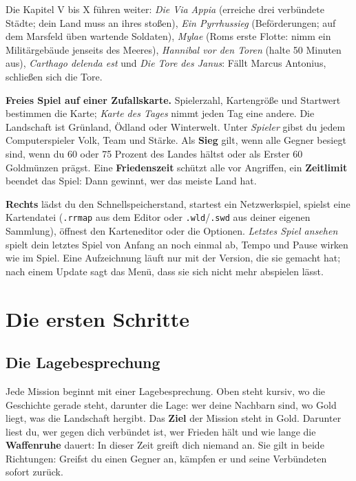 \documentclass[a4paper,11pt,oneside,DIV=12,headings=small,toc=chapterentrydotfill]{scrbook}
\begin{document}
Die Kapitel V bis X führen weiter: \emph{Die Via Appia} (erreiche drei verbündete Städte; dein Land muss an
ihres stoßen), \emph{Ein Pyrrhussieg} (Beförderungen; auf dem Marsfeld üben wartende Soldaten),
\emph{Mylae} (Roms erste Flotte: nimm ein Militärgebäude jenseits des Meeres), \emph{Hannibal vor den Toren}
(halte 50 Minuten aus), \emph{Carthago delenda est} und \emph{Die Tore des Janus}: Fällt Marcus Antonius,
schließen sich die Tore.

\textbf{Freies Spiel auf einer Zufallskarte.} Spielerzahl, Kartengröße und Startwert bestimmen die Karte;
\emph{Karte des Tages} nimmt jeden Tag eine andere. Die Landschaft ist Grünland, Ödland oder Winterwelt.
Unter \emph{Spieler} gibst du jedem Computerspieler Volk, Team und Stärke. Als \textbf{Sieg} gilt, wenn alle
Gegner besiegt sind, wenn du 60 oder 75 Prozent des Landes hältst oder als Erster 60 Goldmünzen prägst.
Eine \textbf{Friedenszeit} schützt alle vor Angriffen, ein \textbf{Zeitlimit} beendet das Spiel: Dann gewinnt,
wer das meiste Land hat.

\textbf{Rechts} lädst du den Schnellspeicherstand, startest ein Netzwerkspiel, spielst eine Kartendatei
(\texttt{.rrmap} aus dem Editor oder \texttt{.wld}/\texttt{.swd} aus deiner eigenen Sammlung), öffnest den
Karteneditor oder die Optionen. \emph{Letztes Spiel ansehen} spielt dein letztes Spiel von Anfang an noch
einmal ab, Tempo und Pause wirken wie im Spiel. Eine Aufzeichnung läuft nur mit der Version, die sie gemacht
hat; nach einem Update sagt das Menü, dass sie sich nicht mehr abspielen lässt.

\chapter{Die ersten Schritte}

\section{Die Lagebesprechung}
Jede Mission beginnt mit einer Lagebesprechung. Oben steht kursiv, wo die Geschichte gerade steht, darunter
die Lage: wer deine Nachbarn sind, wo Gold liegt, was die Landschaft hergibt. Das \textbf{Ziel} der Mission
steht in Gold. Darunter liest du, wer gegen dich verbündet ist, wer Frieden hält und wie lange die
\textbf{Waffenruhe} dauert: In dieser Zeit greift dich niemand an. Sie gilt in beide Richtungen: Greifst du
einen Gegner an, kämpfen er und seine Verbündeten sofort zurück.
\end{document}
